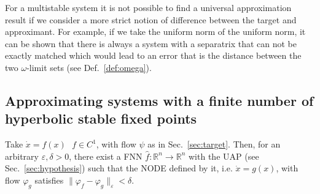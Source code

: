 \documentclass{article}
\newcommand{\reals}{\mathbb{R}}
\newcounter{ct}
\begin{document}
For a multistable system it is not possible to find a universal approximation result if we consider a more strict notion of difference between the target and approximant.
For example, if we take the uniform norm of the uniform norm, it can be shown that there is always a system with a separatrix that can not be exactly matched which would lead to an error that is the distance between the two $\omega$-limit sets (see Def.~\ref{def:omega}).





\subsection{Approximating systems with a finite number of hyperbolic stable fixed points}\label{sec:fp_theorem}

\begin{theorem}\label{thrm:approx}
Take $\dot x = f(x)   \ \ \ f\in C^1$, with flow $\psi$ as in Sec.~\ref{sec:target}.
Then, for an arbitrary $\varepsilon, \delta > 0$, there exist a FNN $\hat f: \reals^n\rightarrow\reals^n$ with the UAP (see Sec.~\ref{sec:hypothesis}) such that the NODE defined by it, i.e. $\dot x = g(x)$,
with flow $\varphi_g$ satisfies $\|\varphi_f- \varphi_g\|_\varepsilon < \delta.$
\end{theorem}

\end{document}
